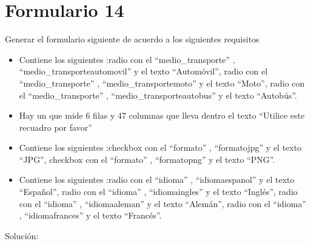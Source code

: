 \documentclass[letterpaper,10pt,spanish]{sphinxmanual}
\begin{document}
\section{Formulario 14}
\label{ejercicios/formularios/anexo_formularios:formulario-14}
Generar el formulario siguiente de acuerdo a los siguientes requisitos
\begin{itemize}
\item {} 
Contiene los siguientes :radio con el   ``medio\_transporte'' ,   ``medio\_transporteautomovil''  y el texto ``Automóvil'', radio con el   ``medio\_transporte'' ,   ``medio\_transportemoto''  y el texto ``Moto'', radio con el   ``medio\_transporte'' ,   ``medio\_transporteautobus''  y el texto ``Autobús''.

\item {} 
Hay un  que mide 6 filas y 47 columnas que lleva dentro el texto ``Utilice este recuadro por favor''

\item {} 
Contiene los siguientes :checkbox con el   ``formato'' ,   ``formatojpg''  y el texto ``JPG'', checkbox con el   ``formato'' ,   ``formatopng''  y el texto ``PNG''.

\item {} 
Contiene los siguientes :radio con el   ``idioma'' ,   ``idiomaespanol''  y el texto ``Español'', radio con el   ``idioma'' ,   ``idiomaingles''  y el texto ``Inglés'', radio con el   ``idioma'' ,   ``idiomaaleman''  y el texto ``Alemán'', radio con el   ``idioma'' ,   ``idiomafrances''  y el texto ``Francés''.

\end{itemize}


Solución:
\end{document}

